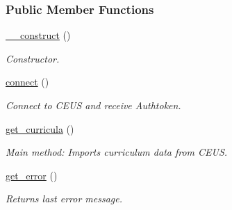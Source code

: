 \subsubsection*{Public Member Functions}
\begin{DoxyCompactItemize}
\item 
\hyperlink{classceus__importer_a095c5d389db211932136b53f25f39685}{\+\_\+\+\_\+construct} ()
\begin{DoxyCompactList}\small\item\em Constructor. \end{DoxyCompactList}\item 
\hyperlink{classceus__importer_a78572828d11dcdf2a498497d9001d557}{connect} ()
\begin{DoxyCompactList}\small\item\em Connect to C\+E\+U\+S and receive Authtoken. \end{DoxyCompactList}\item 
\hyperlink{classceus__importer_abd2f9a9afc073169b2badcb571cc983c}{get\+\_\+curricula} ()
\begin{DoxyCompactList}\small\item\em Main method\+: Imports curriculum data from C\+E\+U\+S. \end{DoxyCompactList}\item 
\hyperlink{classceus__importer_a1c0091515372f72e1a87683ca57c74eb}{get\+\_\+error} ()
\begin{DoxyCompactList}\small\item\em Returns last error message. \end{DoxyCompactList}\end{DoxyCompactItemize}
